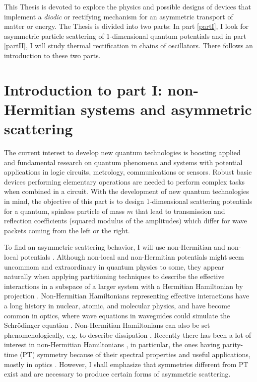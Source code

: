 This Thesis is devoted to explore the physics and possible designs of devices that implement a \textit{diodic} or rectifying mechanism for an asymmetric transport of matter or energy. The Thesis
is divided into two parts: In part \ref{partI}, I look for asymmetric particle scattering of 1-dimensional quantum potentials and in part \ref{partII}, I will study thermal rectification in chains of oscillators. There follows an introduction to these two parts.


\section*{Introduction to part I: non-Hermitian systems and asymmetric scattering}

The current interest to develop new quantum technologies is boosting applied
and fundamental research on quantum phenomena and systems with potential
applications in logic circuits, metrology, communications or sensors. Robust basic devices performing elementary operations are needed to perform complex tasks when combined in a circuit. With the development of new quantum technologies in mind, the objective of this part is to design 1-dimensional scattering potentials for a quantum, spinless particle of mass $m$ that lead to transmission and reflection coefficients (squared modulus of the amplitudes) which differ for wave packets coming from the left or the right.

To find an asymmetric scattering behavior, I will use non-Hermitian and non-local potentials \cite{Muga2004,Mostafazadeh2018}. Although non-local and non-Hermitian potentials might seem uncommom and extraordinary in quantum physics to some, they appear naturally when applying partitioning techniques to describe the effective interactions in a subspace of a larger system with a Hermitian Hamiltonian by projection \cite{Feshbach1958,Ruschhaupt2004,Muga2004}. Non-Hermitian Hamiltonians representing effective interactions have a long history in nuclear, atomic, and molecular physics, and have become common in optics, where wave equations in waveguides could simulate the Schr\"odinger equation \cite{Ruschhaupt2005,Longhi2017a,Konotop2016}. Non-Hermitian Hamiltonians can also be set phenomenologically, e.g. to describe dissipation \cite{Ruschhaupt2005}. Recently there has been a lot of interest in non-Hermitian Hamiltonians \cite{Nixon2016,Nixon2016a,Chen2017,Ruschhaupt2017,Simon2018,Simon2019a,Alana2020,Bernard2002,Kawabata2019}, in particular, the ones having parity-time (PT) symmetry \cite{Bender1998,Znojil2015} because of their spectral properties and useful applications, mostly in optics  \cite{Longhi2017a,Konotop2016,Longhi2014}. However, I shall emphasize that symmetries different from PT exist and are necessary to produce certain forms of asymmetric scattering.

